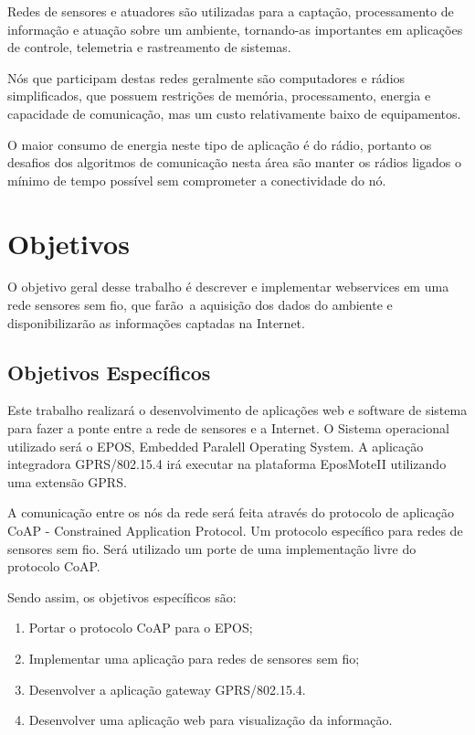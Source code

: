 Redes de sensores e atuadores s\~ao utilizadas para a capta\c{c}\~ao, processamento de informa\c{c}\~ao e atua\c{c}\~ao sobre um ambiente, tornando-as importantes em aplica\c{c}\~oes de controle, telemetria e rastreamento de sistemas.

N\'os que participam destas redes geralmente s\~ao computadores e r\'adios simplificados, que possuem restri\c{c}\~oes de mem\'oria, processamento, energia e capacidade de comunica\c{c}\~ao, mas um custo relativamente baixo de equipamentos.

O maior consumo de energia neste tipo de aplica\c{c}\~ao \'e do r\'adio, portanto os desafios dos algoritmos de comunica\c{c}\~ao nesta \'area s\~ao manter os r\'adios ligados o m\'inimo de tempo poss\'ivel sem comprometer a conectividade do n\'o.

\section{Objetivos}
O objetivo geral desse trabalho \'e descrever e implementar webservices em uma rede sensores sem fio, que far\~ao\
a aquisi\c{c}\~ao dos dados do ambiente e disponibilizar\~ao as informa\c{c}\~oes captadas na Internet.

\subsection{Objetivos Espec\'ificos}
Este trabalho realizar\'a o desenvolvimento de aplica\c{c}\~oes web e software de sistema para fazer a ponte entre a rede de sensores e a Internet. O Sistema operacional utilizado ser\'a o EPOS, Embedded Paralell Operating System. A aplica\c{c}\~ao integradora GPRS/802.15.4 ir\'a executar na plataforma EposMoteII utilizando uma extens\~ao GPRS.

A comunica\c{c}\~ao entre os n\'os da rede ser\'a feita atrav\'es do protocolo de aplica\c{c}\~ao CoAP - Constrained Application Protocol. Um protocolo espec\'ifico para redes de sensores sem fio. Ser\'a utilizado um porte de uma implementa\c{c}\~ao livre do protocolo CoAP.

Sendo assim, os objetivos espec\'ificos s\~ao:
\begin{enumerate}
    \item Portar o protocolo CoAP para o EPOS;
    \item Implementar uma aplica\c{c}\~ao para redes de sensores sem fio;
    \item Desenvolver a aplica\c{c}\~ao gateway GPRS/802.15.4.
    \item Desenvolver uma aplica\c{c}\~ao web para visualiza\c{c}\~ao da informa\c{c}\~ao.
\end{enumerate}


